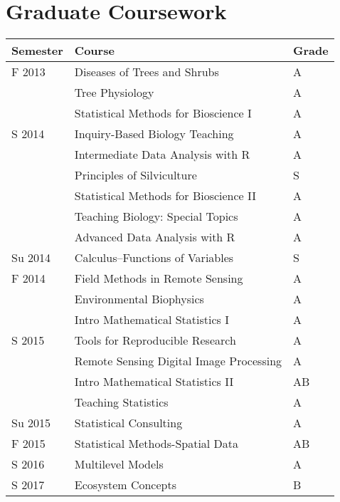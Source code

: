\documentclass[11pt, sans]{moderncv}
\begin{document}
\section*{Graduate Coursework}
\label{sec:org4315abd}
\begin{center}
\begin{tabular}{lll}
Semester & Course & Grade\\
\hline
F 2013 & Diseases of Trees and Shrubs & A\\
 & Tree Physiology & A\\
 & Statistical Methods for Bioscience I & A\\
S 2014 & Inquiry-Based Biology Teaching & A\\
 & Intermediate Data Analysis with R & A\\
 & Principles of Silviculture & S\\
 & Statistical Methods for Bioscience II & A\\
 & Teaching Biology: Special Topics & A\\
 & Advanced Data Analysis with R & A\\
Su 2014 & Calculus--Functions of Variables & S\\
F 2014 & Field Methods in Remote Sensing & A\\
 & Environmental Biophysics & A\\
 & Intro Mathematical Statistics I & A\\
S 2015 & Tools for Reproducible Research & A\\
 & Remote Sensing Digital Image Processing & A\\
 & Intro Mathematical Statistics II & AB\\
 & Teaching Statistics & A\\
Su 2015 & Statistical Consulting & A\\
F 2015 & Statistical Methods-Spatial Data & AB\\
S 2016 & Multilevel Models & A\\
S 2017 & Ecosystem Concepts & B\\
\end{tabular}
\end{center}
\end{document}
